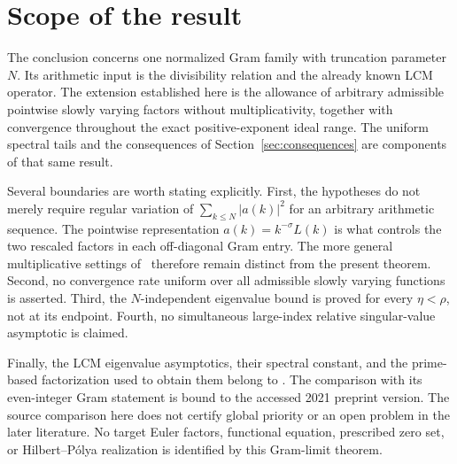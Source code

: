 \section{Scope of the result}
\label{sec:scope}

The conclusion concerns one normalized Gram family with truncation
parameter $N$. Its arithmetic input is the divisibility relation and
the already known LCM operator. The extension established here is
the allowance of arbitrary admissible pointwise slowly varying
factors without multiplicativity, together with convergence throughout
the exact positive-exponent ideal range. The uniform spectral tails
and the consequences of Section~\ref{sec:consequences} are components
of that same result.

Several boundaries are worth stating explicitly. First, the hypotheses
do not merely require regular variation of
$\sum_{k\le N}|a(k)|^2$ for an arbitrary arithmetic sequence.
The pointwise representation $a(k)=k^{-\sigma}L(k)$ is what controls
the two rescaled factors in each off-diagonal Gram entry. The more
general multiplicative settings of~\cite{Hilberdink2017} therefore
remain distinct from the present theorem. Second, no convergence rate
uniform over all admissible slowly varying functions is asserted.
Third, the $N$-independent eigenvalue bound is proved for every
$\eta<\rho$, not at its endpoint. Fourth, no simultaneous
large-index relative singular-value asymptotic is claimed.

Finally, the LCM eigenvalue asymptotics, their spectral constant, and
the prime-based factorization used to obtain them belong to
\cite{HilberdinkPushnitski2023}. The comparison with its even-integer
Gram statement is bound to the accessed 2021 preprint version. The
source comparison here does not certify global priority or an open
problem in the later literature. No target Euler factors, functional
equation, prescribed zero set, or Hilbert--P\'olya realization is
identified by this Gram-limit theorem.
